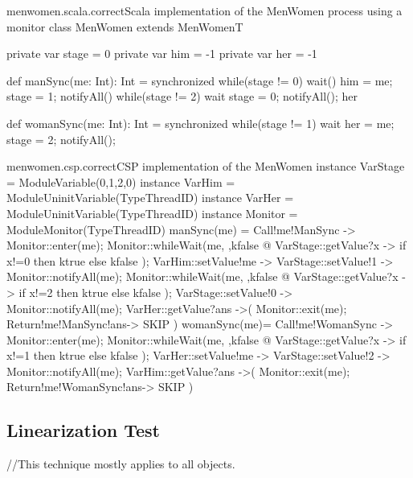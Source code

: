 \documentclass{article}
\begin{document}
\begin{scalafloat}{menwomen.scala.correct}{Scala implementation of the MenWomen process using a monitor}
class MenWomen extends MenWomenT{
  private var stage = 0
  private var him = -1
  private var her = -1

  def manSync(me: Int): Int = synchronized{
    while(stage != 0) wait()         
    him = me; stage = 1; notifyAll() 
    while(stage != 2) wait
    stage = 0; notifyAll(); her
  }

  def womanSync(me: Int): Int = synchronized{
    while(stage != 1) wait
    her = me; stage = 2; notifyAll();
  }
}
\end{scalafloat}

\begin{cspfloat}{menwomen.csp.correct}{CSP implementation of the MenWomen}
instance VarStage = ModuleVariable({0,1,2},0) 
instance VarHim = ModuleUninitVariable(TypeThreadID)
instance VarHer = ModuleUninitVariable(TypeThreadID)
instance Monitor = ModuleMonitor(TypeThreadID)
manSync(me) = 
  Call!me!ManSync ->
  Monitor::enter(me);
    Monitor::whileWait(me, \ktrue,kfalse @
      VarStage::getValue?x ->
      if x!=0 then ktrue else kfalse
    );
    VarHim::setValue!me ->
    VarStage::setValue!1 ->
    Monitor::notifyAll(me);
    Monitor::whileWait(me, \ktrue,kfalse @
      VarStage::getValue?x ->
      if x!=2 then ktrue else kfalse
    );
    VarStage::setValue!0 ->
    Monitor::notifyAll(me);
    VarHer::getValue?ans ->(
  Monitor::exit(me);
  Return!me!ManSync!ans->
  SKIP
  )
womanSync(me)=
  Call!me!WomanSync ->
  Monitor::enter(me);
    Monitor::whileWait(me, \ktrue,kfalse @
      VarStage::getValue?x ->
      if x!=1 then ktrue else kfalse
    );
    VarHer::setValue!me ->
    VarStage::setValue!2 ->
    Monitor::notifyAll(me);
    VarHim::getValue?ans ->(
  Monitor::exit(me);
  Return!me!WomanSync!ans->
  SKIP
  )
\end{cspfloat}


\subsection{Linearization Test}
//This technique mostly applies to all objects.
\end{document}
